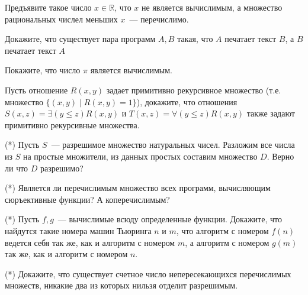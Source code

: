 \setcounter{curtask}{1}


\begin{task}
    Предъявите такое число $x \in \mathbb{R}$, что $x$ не является
    вычислимым, а множество рациональных числел меньших $x$~---
    перечислимо.
\end{task}

\begin{task}
    Докажите, что существует пара программ $A, B$ такая, что $A$
    печатает текст $B$, а $B$ печатает текст $A$
\end{task}

\begin{task}
    Покажите, что число $\pi$ является вычислимым.
\end{task}

\begin{task}
    Пусть отношение $R(x, y)$ задает примитивно рекурсивное множество
    (т.е. множество $\{(x, y) \mid R(x, y) = 1\}$), докажите, что
    отношения $S(x, z) = \exists (y \le z) R(x, y)$ и
    $T(x, z) = \forall (y \le z) R(x, y)$ также задают примитивно
    рекурсивные множества.
\end{task}


\breakline

\begin{task}(*)
    Пусть $S$~--- разрешимое множество натуральных чисел. Разложим все
    числа из $S$ на простые множители, из данных простых составим
    множество $D$. Верно ли что $D$ разрешимо?
\end{task}

\begin{task}(*)
    Является ли перечислимым множество всех программ, вычисляющим
    сюръективные функции? А коперечислимым?
\end{task}

\begin{task}(*)
    Пусть $f, g$~--- вычислимые всюду определенные функции. Докажите,
    что найдутся такие номера машин Тьюринга $n$ и $m$, что алгоритм с
    номером $f(n)$ ведется себя так же, как и алгоритм с номером $m$,
    а алгоритм с номером $g(m)$ так же, как и алгоритм с номером $n$.
\end{task}

\begin{task}(*)
    Докажите, что существует счетное число непересекающихся
    перечислимых множеств, никакие два из которых нильзя отделит
    разрешимым.
\end{task}